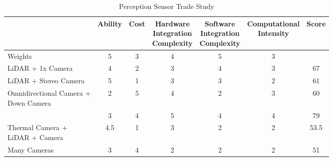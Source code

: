 \documentclass{article}
\begin{document}
		\begin{table}[H]
		\begin{adjustwidth}{0in}{0in}
		\setlength{\dashlinedash}{.4pt}
		\setlength\tabcolsep{4pt}

		\centering
		\begin{tabular}{|l|c|c|c|c|c|c|}
		\hline
                                                                     & Ability & Cost & \makecell{Hardware \\ Integration \\ Complexity} & \makecell{Software \\ Integration \\ Complexity} & \makecell{Computational \\ Intensity} & Score \\ \hline
		Weights                                                      & 5       & 3    & 4                               & 5                               & 3                       &       \\ \hline
		LiDAR + 1x Camera                                            & 4       & 2    & 3                               & 4                               & 3                       & 67    \\ \hdashline
		LiDAR + Stereo Camera                                        & 5       & 1    & 3                               & 3                               & 2                       & 61    \\ \hdashline
		\makecell[l]{Omnidirectional Camera + \\ Down Camera}        & 2       & 5    & 4                               & 2                               & 3                       & 60    \\ \hdashline
		\multicolumn{1}{|l|}{\cellcolor{highlight}Stereo Camera Only}& \multicolumn{1}{c|}{\cellcolor{highlight}3} & \multicolumn{1}{c|}{\cellcolor{highlight}4} & \multicolumn{1}{c|}{\cellcolor{highlight}5} & \multicolumn{1}{c|}{\cellcolor{highlight}4} & \multicolumn{1}{c|}{\cellcolor{highlight}4} & \multicolumn{1}{c|}{\cellcolor{highlight}79}    \\ \hdashline
		\makecell[l]{Thermal Camera + \\ LiDAR + Camera}             & 4.5     & 1    & 3                               & 2                               & 2                       & 53.5  \\ \hdashline
		Many Cameras                                                 & 3       & 4    & 2                               & 2                               & 2                       & 51    \\ \hline
		\end{tabular}
		\caption{Perception Sensor Trade Study}
		\label{my-label}
		\end{adjustwidth}
		\end{table}
\end{document}
